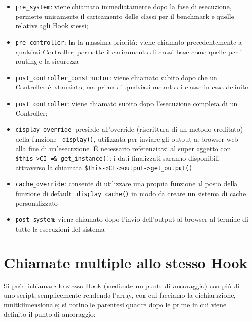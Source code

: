 \begin{itemize}
\item \verb|pre_system|: viene chiamato immediatamente dopo la fase di esecuzione, permette unicamente il caricamento delle classi per il benchmark e quelle relative agli Hook stessi;
\item \verb|pre_controller|: ha la massima priorità: viene chiamato precedentemente a qualsiasi Controller; permette il caricamento di classi base come quelle per il routing e la sicurezza
\item \verb|post_controller_constructor|: viene chiamato subito dopo che un Controller è istanziato, ma prima di qualsiasi metodo di classe in esso definito
\item \verb|post_controller|: viene chiamato subito dopo l'esecuzione completa di un Controller;
\item \verb|display_override|: presiede all'override (riscrittura di un metodo ereditato) della funzione \verb|_display()|, utilizzata per inviare gli output al browser web alla fine di un'esecuzione. \'E necessario referenziarsi al super oggetto con \verb|$this->CI =& get_instance()|; i dati finalizzati saranno disponibili attraverso la chiamata \verb|$this->CI->output->get_output()|
\item \verb|cache_override|: consente di utilizzare una propria funzione al posto della funzione di default \verb|_display_cache()| in modo da creare un sistema di cache personalizzato


\item \verb|post_system|: viene chiamato dopo l'invio dell'output al browser al termine di tutte le esecuzioni del sistema
\end{itemize} 

\section{Chiamate multiple allo stesso Hook}

Si può richiamare lo stesso Hook (mediante un punto di ancoraggio) con più di uno script, semplicemente rendendo l'array, con cui facciamo la dichiarazione, multidimensionale; si notino le parentesi quadre dopo le prime in cui viene definito il punto di ancoraggio:

